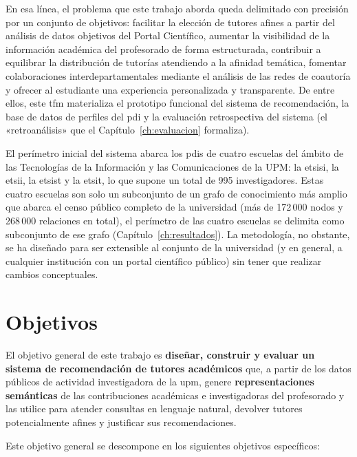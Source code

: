En esa línea, el problema que este trabajo aborda queda delimitado con precisión por un conjunto de objetivos: facilitar la elección de tutores afines a partir del análisis de datos objetivos del Portal Científico, aumentar la visibilidad de la información académica del profesorado de forma estructurada, contribuir a equilibrar la distribución de tutorías atendiendo a la afinidad temática, fomentar colaboraciones interdepartamentales mediante el análisis de las redes de coautoría y ofrecer al estudiante una experiencia personalizada y transparente.
De entre ellos, este \gls{tfm} materializa el prototipo funcional del sistema de recomendación, la base de datos de perfiles del \gls{pdi} y la evaluación retrospectiva del sistema (el «retroanálisis» que el Capítulo~\ref{ch:evaluacion} formaliza).

El perímetro inicial del sistema abarca los \glspl{pdi} de cuatro escuelas del ámbito de las Tecnologías de la Información y las Comunicaciones de la UPM: la \acrfull{etsisi}, la \gls{etsii}, la \gls{etsist} y la \gls{etsit}, lo que supone un total de 995 investigadores.
Estas cuatro escuelas son solo un subconjunto de un grafo de conocimiento más amplio que abarca el censo público completo de la universidad (más de 172\,000 nodos y 268\,000 relaciones en total), el perímetro de las cuatro escuelas se delimita como subconjunto de ese grafo (Capítulo~\ref{ch:resultados}).
La metodología, no obstante, se ha diseñado para ser extensible al conjunto de la universidad (y en general, a cualquier institución con un portal científico público) sin tener que realizar cambios conceptuales.

\section{Objetivos}
\label{sec:objetivos}

El objetivo general de este trabajo es \textbf{diseñar, construir y evaluar un sistema de recomendación de tutores académicos} que, a partir de los datos públicos de actividad investigadora de la \gls{upm}, genere \textbf{representaciones semánticas} de las contribuciones académicas e investigadoras del profesorado y las utilice para atender consultas en lenguaje natural, devolver tutores potencialmente afines y justificar sus recomendaciones.

Este objetivo general se descompone en los siguientes objetivos específicos:

